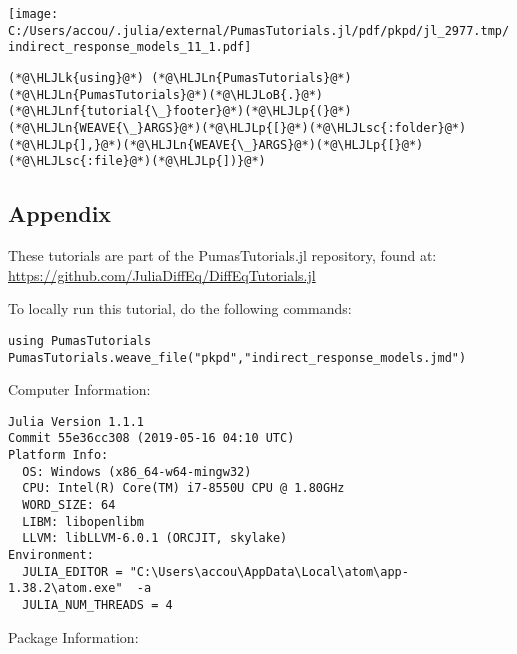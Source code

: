 \documentclass[12pt,a4paper]{article}
\newcommand{\HLJLk}[1]{\textcolor[RGB]{148,91,176}{\textbf{#1}}}
\newcommand{\HLJLn}[1]{#1}
\newcommand{\HLJLnf}[1]{\textcolor[RGB]{66,102,213}{#1}}
\newcommand{\HLJLsc}[1]{\textcolor[RGB]{201,61,57}{#1}}
\newcommand{\HLJLoB}[1]{\textcolor[RGB]{102,102,102}{\textbf{#1}}}
\newcommand{\HLJLp}[1]{#1}
\begin{document}
\texttt{[image: C:/Users/accou/.julia/external/PumasTutorials.jl/pdf/pkpd/jl\_2977.tmp/indirect\_response\_models\_11\_1.pdf]}

\begin{lstlisting}
(*@\HLJLk{using}@*) (*@\HLJLn{PumasTutorials}@*)
(*@\HLJLn{PumasTutorials}@*)(*@\HLJLoB{.}@*)(*@\HLJLnf{tutorial{\_}footer}@*)(*@\HLJLp{(}@*)(*@\HLJLn{WEAVE{\_}ARGS}@*)(*@\HLJLp{[}@*)(*@\HLJLsc{:folder}@*)(*@\HLJLp{],}@*)(*@\HLJLn{WEAVE{\_}ARGS}@*)(*@\HLJLp{[}@*)(*@\HLJLsc{:file}@*)(*@\HLJLp{])}@*)
\end{lstlisting}


\subsection{Appendix}
These tutorials are part of the PumasTutorials.jl repository, found at: \href{https://github.com/JuliaDiffEq/DiffEqTutorials.jl}{https://github.com/JuliaDiffEq/DiffEqTutorials.jl}


To locally run this tutorial, do the following commands:

\begin{verbatim}
using PumasTutorials
PumasTutorials.weave_file("pkpd","indirect_response_models.jmd")
\end{verbatim}

Computer Information:


\begin{verbatim}
Julia Version 1.1.1
Commit 55e36cc308 (2019-05-16 04:10 UTC)
Platform Info:
  OS: Windows (x86_64-w64-mingw32)
  CPU: Intel(R) Core(TM) i7-8550U CPU @ 1.80GHz
  WORD_SIZE: 64
  LIBM: libopenlibm
  LLVM: libLLVM-6.0.1 (ORCJIT, skylake)
Environment:
  JULIA_EDITOR = "C:\Users\accou\AppData\Local\atom\app-1.38.2\atom.exe"  -a
  JULIA_NUM_THREADS = 4

\end{verbatim}

Package Information:
\end{document}
